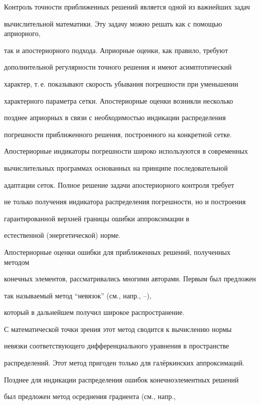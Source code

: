 Контроль точности приближенных решений является одной из важнейших задач


вычислительной математики. Эту задачу можно решать как с помощью априорного,


так и апостериорного подхода. Априорные оценки, как правило, требуют 


дополнительной регулярности точного решения и имеют асимптотический 


характер, т.\,е. показывают скорость убывания погрешности при уменьшении 


характерного параметра сетки. Апостериорные оценки возникли несколько 


позднее априорных в связи с необходимостью индикации распределения


погрешности приближенного решения, построенного на конкретной сетке.


Апостериорные индикаторы погрешности широко используются в современных 


вычислительных программах основанных на принципе последовательной 


адаптации сеток. Полное решение задачи апостериорного контроля требует 


не только получения индикатора распределения погрешности, но и построения 


гарантированной верхней границы ошибки аппроксимации в


естественной (энергетической) норме.





Апостериорные оценки ошибки для приближенных решений, полученных методом 


конечных элементов, рассматривались многими авторами. Первым был предложен


так называемый метод ``невязок'' (см., напр., \cite{AiOd}--\cite{Ve}), 


который в дальнейшем получил широкое распространение.


С математической точки зрения этот метод сводится к вычислению нормы 


невязки соответствующего дифференциального уравнения в пространстве 


распределений. Этот метод пригоден только для гал\"еркинских аппроксимаций. 


Позднее для индикации распределения ошибок конечноэлементных решений


был предложен метод осреднения градиента (см., напр.,


